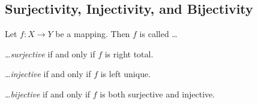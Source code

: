 
\subsection{Surjectivity, Injectivity, and Bijectivity}

\begin{definition}
    Let $f\colon X\rightarrow Y$ be a mapping. Then $f$ is called \dots
    \begin{definitionenumerate}
        \item \dots \emph{surjective} if and only if $f$ is right total.
        \item \dots \emph{injective} if and only if $f$ is left unique.
        \item \dots \emph{bijective} if and only if $f$ is both surjective and injective.
    \end{definitionenumerate}
\end{definition}

